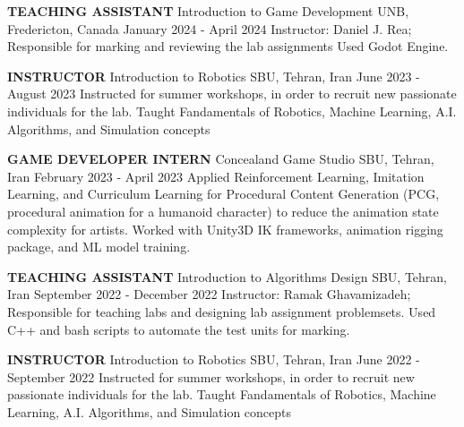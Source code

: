 \begin{cventries}
    \cventry
    {\textbf{TEACHING ASSISTANT}}
    {Introduction to Game Development}
    {UNB, Fredericton, Canada}
    {January 2024 - April 2024}
    {Instructor: Daniel J. Rea; Responsible for marking and reviewing the lab assignments \newline Used Godot Engine.}
    \vspace{0.4 cm}
\end{cventries}

\begin{cventries}
    \cventry
    {\textbf{INSTRUCTOR}}
    {Introduction to Robotics}
    {SBU, Tehran, Iran}
    {June 2023 - August 2023}
    {Instructed for summer workshops, in order to recruit new passionate individuals for the lab.
    \newline Taught Fandamentals of Robotics, Machine Learning, A.I. Algorithms, and Simulation concepts}
    \vspace{0.4 cm}
\end{cventries}

\begin{cventries}
    \cventry
    {\textbf{GAME DEVELOPER INTERN}}
    {Concealand Game Studio}
    {SBU, Tehran, Iran}
    {February 2023 - April 2023}
    {Applied Reinforcement Learning, Imitation Learning, and Curriculum Learning for Procedural Content Generation (PCG, procedural animation for a humanoid character) to reduce the animation state complexity for artists. \newline Worked with Unity3D IK frameworks, animation rigging package, and ML model training.}
\end{cventries}
\begin{cventries}
    \cventry
    {\textbf{TEACHING ASSISTANT}}
    {Introduction to Algorithms Design}
    {SBU, Tehran, Iran}
    {September 2022 - December 2022}
    {Instructor: Ramak Ghavamizadeh; Responsible for teaching labs and designing lab assignment problemsets.
    \newline Used C++ and bash scripts to automate the test units for marking.}
    \vspace{0.4 cm}
\end{cventries}

\begin{cventries}
    \cventry
    {\textbf{INSTRUCTOR}}
    {Introduction to Robotics}
    {SBU, Tehran, Iran}
    {June 2022 - September 2022}
    {Instructed for summer workshops, in order to recruit new passionate individuals for the lab.
    \newline Taught Fandamentals of Robotics, Machine Learning, A.I. Algorithms, and Simulation concepts}
    \vspace{0.4 cm}
\end{cventries}

